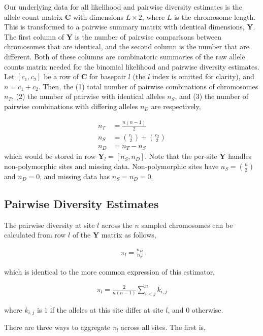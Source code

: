 \documentclass[11pt]{article}
\begin{document}
Our underlying data for all likelihood and pairwise diversity estimates is the
allele count matrix $\mathbf{C}$ with dimensions $L \times 2$, where $L$ is the
chromosome length. This is transformed to a pairwise summary matrix with
identical dimensions, $\mathbf{Y}$. The first column of $\mathbf{Y}$ is the
number of pairwise comparisons between chromosomes that are identical, and the
second column is the number that are different. Both of these columns are
combinatoric summaries of the raw allele counts matrix needed for the binomial
likelihood and pairwise diversity estimates. Let $[c_1, c_2]$ be a row of
$\mathbf{C}$ for basepair $l$ (the $l$ index is omitted for clarity), and $n =
c_1 + c_2$. Then, the (1) total number of pairwise combinations of chromosomes
$n_T$, (2) the number of pairwise with identical alleles $n_S$, and (3) the
number of pairwise combinations with differing alleles $n_D$ are respectively,

\begin{align*}
  n_T &= \frac{n(n-1)}{2} \\
  n_S &= {c_1 \choose 2} + {c_2 \choose 2} \\
  n_D &= n_T - n_S
\end{align*}
%
which would be stored in row $\mathbf{Y}_l = [n_S, n_D]$. Note that the
per-site $\mathbf{Y}$ handles non-polymorphic sites and missing data.
Non-polymorphic sites have $n_S = {n \choose 2}$ and $n_D = 0$, and missing
data has $n_S = n_D = 0$.

\subsection{Pairwise Diversity Estimates}
\label{suppsec:diversity}

The pairwise diversity at site $l$ across the $n$ sampled chromosomes can be
calculated from row $l$ of the $\mathbf{Y}$ matrix as follows,

\begin{align}
  \pi_l = \frac{n_D}{n_T}
\end{align}

which is identical to the more common expression of this estimator, 

\begin{align}
  \pi_l = \frac{2}{n(n-1)} \sum_{i < j}^n k_{i,j}
\end{align}

where $k_{i,j}$ is 1 if the alleles at this site differ at site $l$, and 0
otherwise.

There are three ways to aggregate $\pi_l$ across all sites. The first is,
\end{document}

